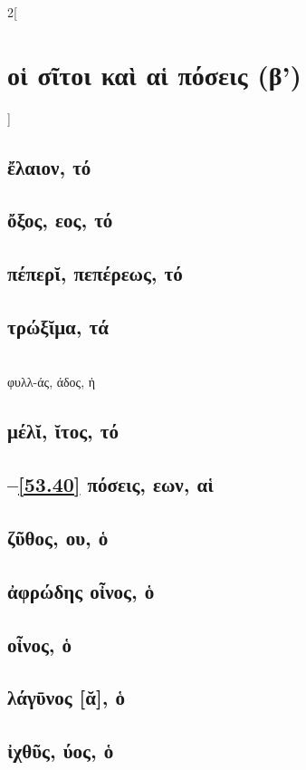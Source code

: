\documentclass{book}
\begin{document}
\begin{multicols}{2}[\section{οἱ σῖτοι καὶ αἱ πόσεις (β')}]
\subsection{ἔλαιον, τό}
\subsection{ὄξος, εος, τό}
\subsection{πέπερῐ, πεπέρεως, τό}
\subsection{τρώξῐμα, τά}
 ~\\
φυλλ-άς, άδος, ἡ
\subsection{μέλῐ, ῐτος, τό}
\subsection{\protect\hspace{-2ex}--\ref{53.40} πόσεις, εων, αἱ}
 \setcounter{subsection}{36}
\subsection{ζῦθος, ου, ὁ}
\subsection{ἀφρώδης οἶνος, ὁ}
\subsection{οἶνος, ὁ}
 \label{53.40} 
\subsection{λάγῡνος [ᾰ], ὁ}
\subsection{ἰχθῦς, ύος, ὁ}
~
\end{multicols}
\end{document}
